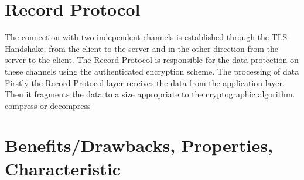 \section{Record Protocol}
\label{sec:record_protocol}

The connection with two independent channels is established through the TLS Handshake, from the client to the server and in the other direction from the server to the client. The Record Protocol is responsible for the data protection on these channels using the authenticated encryption scheme. The processing of data 
Firstly the Record Protocol layer receives the data from the application layer. Then it fragments the data to a size appropriate to the cryptographic algorithm. compress or decompress 


\section{Benefits/Drawbacks, Properties, Characteristic}
\label{sec:introduction_suggestions}



